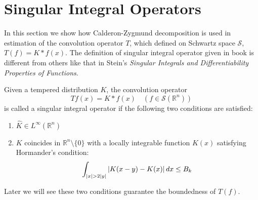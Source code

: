 % 
\section{Singular Integral Operators}
In this section we show how Calderon-Zygmund decomposition is used in estimation of the convolution operator $T$, which defined on Schwartz space $\mathscr{S}$,
$T(f)=K*f(x)$. The definition of singular integral operator given in book is different from others like that in Stein's \emph{Singular Integrals and Differentiability Properties of Functions}.
\begin{definition}
    Given a tempered distribution $K$, the convolution operator
    \begin{equation*}
        T f(x)=K*f(x)\quad (f\in\mathscr{S}(\mathbb{R}^n))
    \end{equation*}
    is called a singular integral operator if the following two conditions are satisfied:
    \begin{enumerate}
        \item $\hat{K}\in L^\infty(\mathbb{R}^n)$
        \item $K$ coincides in $\mathbb{R}^n\setminus\{0\}$ with a locally integrable function $K(x)$ satisfying Hormander's condition:
              \begin{equation*}
                  \int_{\left\lvert x\right\rvert>2\left\lvert y\right\rvert}\left\lvert K(x-y)-K(x)\right\rvert dx\leq B_k
              \end{equation*}
    \end{enumerate}
\end{definition}
Later we will see these two conditions guarantee the boundedness of $T(f)$.
